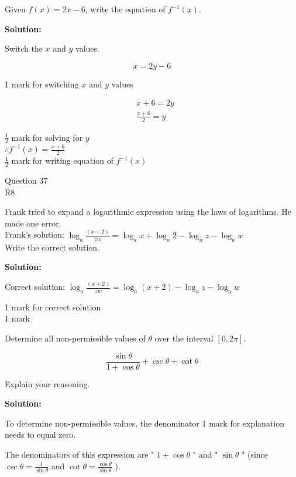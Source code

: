 \documentclass[12pt,addpoints,answers]{exam}
\begin{document}
\begin{questions}
\question
\leavevmode
Given $f(x)=2 x-6$, write the equation of $f^{-1}(x)$.
\begin{solution}
\textbf{Solution:}\par
Switch the $x$ and $y$ values.

$$
x=2 y-6
$$

1 mark for switching $x$ and $y$ values

$$
\begin{aligned}
& x+6=2 y \\
& \frac{x+6}{2}=y
\end{aligned}
$$

$\frac{1}{2}$ mark for solving for $y$\\
$\therefore f^{-1}(x)=\frac{x+6}{2}$\\
$\frac{1}{2}$ mark for writing equation of $f^{-1}(x)$


\end{solution}

\question
\leavevmode
Question 37\\
R8

Frank tried to expand a logarithmic expression using the laws of logarithms. He made one error.\\
Frank's solution: $\log _{a} \frac{(x+2)}{z w}=\log _{a} x+\log _{a} 2-\log _{a} z-\log _{a} w$\\
Write the correct solution.
\begin{solution}
\textbf{Solution:}\par
Correct solution: $\log _{a} \frac{(x+2)}{z w}=\log _{a}(x+2)-\log _{a} z-\log _{a} w$

1 mark for correct solution\\
1 mark
\end{solution}

\question
\leavevmode
Determine all non-permissible values of $\theta$ over the interval $[0,2 \pi]$.

$$
\frac{\sin \theta}{1+\cos \theta}+\csc \theta+\cot \theta
$$

Explain your reasoning.
\begin{solution}
\textbf{Solution:}\par
To determine non-permissible values, the denominator 1 mark for explanation needs to equal zero.

The denominators of this expression are " $1+\cos \theta$ " and " $\sin \theta$ " (since $\csc \theta=\frac{1}{\sin \theta}$ and $\cot \theta=\frac{\cos \theta}{\sin \theta}$ ).


\end{solution}
\end{questions}
\end{document}

